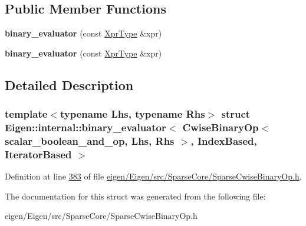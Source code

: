 \subsection*{Public Member Functions}
\begin{DoxyCompactItemize}
\item 
\mbox{\label{struct_eigen_1_1internal_1_1binary__evaluator_3_01_cwise_binary_op_3_01scalar__boolean__and__op_e5783d1feefabf80ecedbbd659dac347_a798104c34bbdb42c524111d8eef0ccab}} 
{\bfseries binary\+\_\+evaluator} (const \hyperlink{group___core___module_class_eigen_1_1_cwise_binary_op}{Xpr\+Type} \&xpr)
\item 
\mbox{\label{struct_eigen_1_1internal_1_1binary__evaluator_3_01_cwise_binary_op_3_01scalar__boolean__and__op_e5783d1feefabf80ecedbbd659dac347_a798104c34bbdb42c524111d8eef0ccab}} 
{\bfseries binary\+\_\+evaluator} (const \hyperlink{group___core___module_class_eigen_1_1_cwise_binary_op}{Xpr\+Type} \&xpr)
\end{DoxyCompactItemize}


\subsection{Detailed Description}
\subsubsection*{template$<$typename Lhs, typename Rhs$>$\newline
struct Eigen\+::internal\+::binary\+\_\+evaluator$<$ Cwise\+Binary\+Op$<$ scalar\+\_\+boolean\+\_\+and\+\_\+op, Lhs, Rhs $>$, Index\+Based, Iterator\+Based $>$}



Definition at line \hyperlink{eigen_2_eigen_2src_2_sparse_core_2_sparse_cwise_binary_op_8h_source_l00383}{383} of file \hyperlink{eigen_2_eigen_2src_2_sparse_core_2_sparse_cwise_binary_op_8h_source}{eigen/\+Eigen/src/\+Sparse\+Core/\+Sparse\+Cwise\+Binary\+Op.\+h}.



The documentation for this struct was generated from the following file\+:\begin{DoxyCompactItemize}
\item 
eigen/\+Eigen/src/\+Sparse\+Core/\+Sparse\+Cwise\+Binary\+Op.\+h\end{DoxyCompactItemize}
